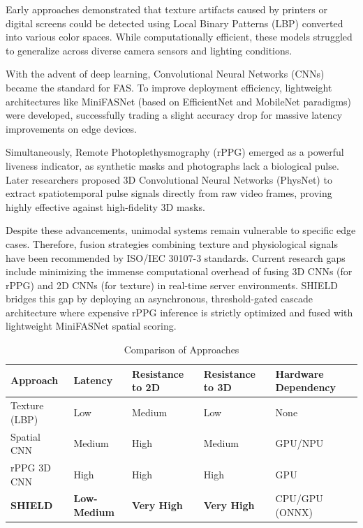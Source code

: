 \documentclass[12pt, a4paper]{report}
\begin{document}
Early approaches demonstrated that texture artifacts caused by printers or digital screens could be detected using Local Binary Patterns (LBP) converted into various color spaces. While computationally efficient, these models struggled to generalize across diverse camera sensors and lighting conditions.

With the advent of deep learning, Convolutional Neural Networks (CNNs) became the standard for FAS. To improve deployment efficiency, lightweight architectures like MiniFASNet (based on EfficientNet and MobileNet paradigms) were developed, successfully trading a slight accuracy drop for massive latency improvements on edge devices.

Simultaneously, Remote Photoplethysmography (rPPG) emerged as a powerful liveness indicator, as synthetic masks and photographs lack a biological pulse. Later researchers proposed 3D Convolutional Neural Networks (PhysNet) to extract spatiotemporal pulse signals directly from raw video frames, proving highly effective against high-fidelity 3D masks.

Despite these advancements, unimodal systems remain vulnerable to specific edge cases. Therefore, fusion strategies combining texture and physiological signals have been recommended by ISO/IEC 30107-3 standards. Current research gaps include minimizing the immense computational overhead of fusing 3D CNNs (for rPPG) and 2D CNNs (for texture) in real-time server environments. SHIELD bridges this gap by deploying an asynchronous, threshold-gated cascade architecture where expensive rPPG inference is strictly optimized and fused with lightweight MiniFASNet spatial scoring.

\begin{table}[H]
\centering
\caption{Comparison of Approaches}
\begin{tabularx}{\textwidth}{|l|l|X|X|X|}
\hline
\textbf{Approach} & \textbf{Latency} & \textbf{Resistance to 2D} & \textbf{Resistance to 3D} & \textbf{Hardware Dependency} \\
\hline
Texture (LBP) & Low & Medium & Low & None \\
Spatial CNN & Medium & High & Medium & GPU/NPU \\
rPPG 3D CNN & High & High & High & GPU \\
\textbf{SHIELD} & \textbf{Low-Medium} & \textbf{Very High} & \textbf{Very High} & CPU/GPU (ONNX) \\
\hline
\end{tabularx}
\end{table}
\end{document}
